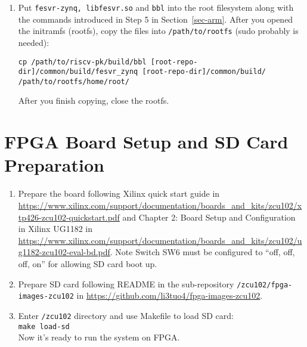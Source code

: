 \documentclass[a4paper,11pt]{article}
\begin{document}
\begin{enumerate}
\item Put {\tt fesvr-zynq, libfesvr.so} and {\tt bbl} into the root filesystem along with the commands introduced in Step 5 in Section~\ref{sec-arm}.
After you opened the initramfs (rootfs), copy the files into \texttt{/path/to/rootfs} (sudo probably is needed):
\begin{lstlisting}
cp /path/to/riscv-pk/build/bbl [root-repo-dir]/common/build/fesvr_zynq [root-repo-dir]/common/build/ /path/to/rootfs/home/root/
\end{lstlisting}
After you finish copying, close the rootfs.

\end{enumerate}

\section{FPGA Board Setup and SD Card Preparation}
\begin{enumerate}
\item Prepare the board following Xilinx quick start guide in \url{https://www.xilinx.com/support/documentation/boards_and_kits/zcu102/xtp426-zcu102-quickstart.pdf} and Chapter 2: Board Setup and Configuration in Xilinx UG1182 in \url{https://www.xilinx.com/support/documentation/boards_and_kits/zcu102/ug1182-zcu102-eval-bd.pdf}. Note Switch SW6 must be configured to ``off, off, off, on'' for allowing SD card boot up.
\item Prepare SD card following README in the sub-repository {\tt \rootdir/zcu102/fpga-images-zcu102} in \url{https://github.com/li3tuo4/fpga-images-zcu102}.
\item Enter {\tt \rootdir/zcu102} directory and use Makefile to load SD card:\\
{\tt make load-sd}\\
Now it's ready to run the system on FPGA.
\end{enumerate}
\end{document}
